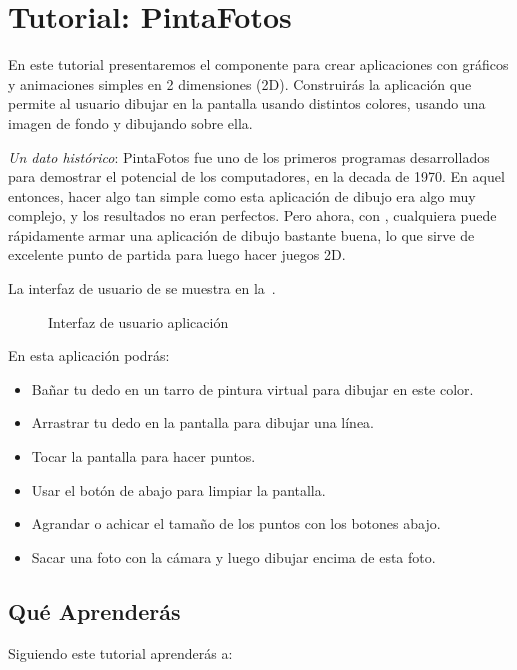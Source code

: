 \section{Tutorial: PintaFotos}

En este tutorial presentaremos el componente  para
crear aplicaciones con gráficos y animaciones simples en 2 dimensiones
(2D). Construirás la aplicación  que permite al
usuario dibujar en la pantalla usando distintos colores, usando una
imagen de fondo y dibujando sobre ella.

\emph{Un dato histórico}: PintaFotos fue uno de los primeros programas
desarrollados para demostrar el potencial de los computadores, en la
decada de 1970. En aquel entonces, hacer algo tan simple como esta
aplicación de dibujo era algo muy complejo, y los resultados no eran
perfectos. Pero ahora, con \AppInventor, cualquiera puede rápidamente
armar una aplicación de dibujo bastante buena, lo que sirve de
excelente punto de partida para luego hacer juegos 2D.

La interfaz de usuario de  se muestra en
la~.

\begin{figure}[H]
\centering
\caption{Interfaz de usuario aplicación }
\label{fig:appUI}
\end{figure}

En esta aplicación podrás:

\begin{itemize}
\item Bañar tu dedo en un tarro de pintura virtual para dibujar en
  este color.
\item Arrastrar tu dedo en la pantalla para dibujar una línea.
\item Tocar la pantalla para hacer puntos.
\item Usar el botón de abajo para limpiar la pantalla.
\item Agrandar o achicar el tamaño de los puntos con los botones
  abajo.
\item Sacar una foto con la cámara y luego dibujar encima de esta foto.
\end{itemize}

\subsection*{Qué Aprenderás}

Siguiendo este tutorial aprenderás a:

